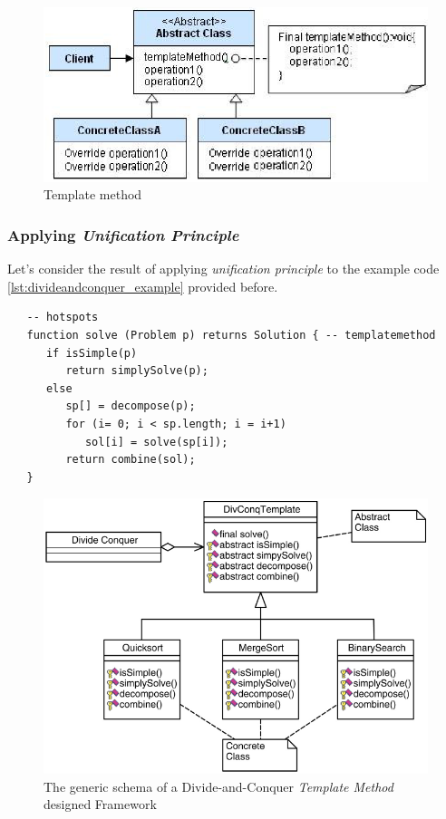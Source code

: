 \begin{figure}[htbp]
   \centering
   \includegraphics{images/dp_templatemethod.png}
   \caption{Template method}
   \label{fig:dp_templatemethod}
\end{figure}

\subsubsection{Applying \textit{Unification Principle}}
Let's consider the result of applying \textit{unification principle} to the example code \ref{lst:divideandconquer_example} provided before.
\begin{lstlisting}
   -- hotspots
   function solve (Problem p) returns Solution { -- templatemethod
      if isSimple(p)
         return simplySolve(p);
      else
         sp[] = decompose(p);
         for (i= 0; i < sp.length; i = i+1)
            sol[i] = solve(sp[i]);
         return combine(sol);
   }
\end{lstlisting}
\lstset{style=javaBlock}

\begin{figure}[htbp]
   \centering
   \includegraphics{images/dp_templatemethod_divide.png} 
   \caption{The generic schema of a Divide-and-Conquer \textit{Template Method} designed Framework}
   \label{fig:dp_templatemethod_code}
\end{figure}

